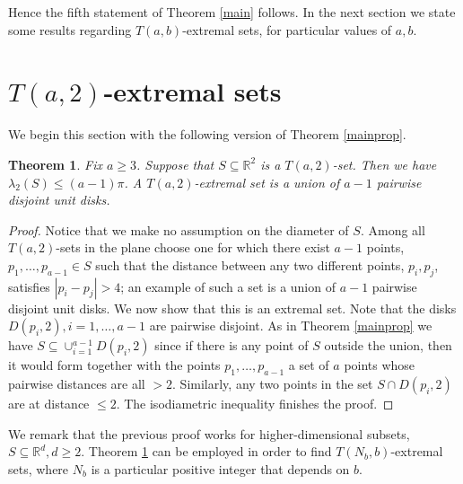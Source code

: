 \documentclass[12pt]{article}
\newtheorem{thm}{Theorem}[section]
\begin{document}
Hence the fifth statement of Theorem \ref{main} follows. In the next section we state some 
results regarding
$T(a,b)$-extremal sets, for particular values of $a,b$.

\section{$T(a,2)$-extremal sets}
\label{abproperty}

We begin this section with the following version of Theorem \ref{mainprop}.

\begin{thm}\label{atwo}  Fix $a\geq 3$. Suppose that $S\subseteq \mathbb{R}^2$ is a $T(a,2)$-set.
Then we have $\lambda_2(S) \leq (a-1) \pi$. A $T(a,2)$-extremal set is a 
union of $a-1$ pairwise disjoint unit disks.
\end{thm}
\begin{proof} Notice that we make no assumption on the diameter of $S$. 
Among all $T(a,2)$-sets in the plane choose one 
for which 
there exist $a-1$ points, $p_1,\ldots,p_{a-1}\in S$ such that the distance between 
any two different points, $p_i, p_j$, satisfies $|p_i-p_j|> 4$;
an example of such a set is a union of $a-1$ pairwise disjoint unit disks.
We now show that this is an extremal set.
Note that the disks $D(p_i,2), i=1,\ldots,a-1$ are pairwise disjoint. 
As in Theorem \ref{mainprop}
we have $S\subseteq \cup_{i=1}^{a-1} D(p_i,2)$ since if there is any point of $S$ outside the union, then it 
would form together with the points   $p_1,\ldots,p_{a-1}$ a set of $a$ points whose pairwise distances 
are all $>2$.
Similarly, any two points in the set $S \cap D(p_i,2)$ are at distance $\leq 2$.
The isodiametric inequality finishes the proof.
\end{proof}

We remark that the previous proof works for higher-dimensional subsets, $S\subseteq \mathbb{R}^d,d\geq 2$.
Theorem \ref{atwo} can be employed in order to find $T(N_b,b)$-extremal sets, where $N_b$ is a particular 
positive integer that depends on $b$.  
\end{document}
